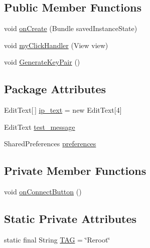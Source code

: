 \subsection*{\-Public \-Member \-Functions}
\begin{DoxyCompactItemize}
\item 
void \hyperlink{classcom_1_1_cyberpad_1_1_reroot_1_1_reroot_activity_a1f36a4a3312550c535dc625f5ef7072a}{on\-Create} (\-Bundle saved\-Instance\-State)
\item 
void \hyperlink{classcom_1_1_cyberpad_1_1_reroot_1_1_reroot_activity_aa996d456dd9e597c9fe8085b4e22f783}{my\-Click\-Handler} (\-View view)
\item 
void \hyperlink{classcom_1_1_cyberpad_1_1_reroot_1_1_reroot_activity_afac3a9035343d21a0ba2d700ec486a49}{\-Generate\-Key\-Pair} ()
\end{DoxyCompactItemize}
\subsection*{\-Package \-Attributes}
\begin{DoxyCompactItemize}
\item 
\-Edit\-Text\mbox{[}$\,$\mbox{]} \hyperlink{classcom_1_1_cyberpad_1_1_reroot_1_1_reroot_activity_ab56d355f53387eea12c89a3cab10dcd9}{ip\-\_\-text} = new \-Edit\-Text\mbox{[}4\mbox{]}
\item 
\-Edit\-Text \hyperlink{classcom_1_1_cyberpad_1_1_reroot_1_1_reroot_activity_a467adf801369ca5593617c80e73efd4f}{test\-\_\-message}
\item 
\-Shared\-Preferences \hyperlink{classcom_1_1_cyberpad_1_1_reroot_1_1_reroot_activity_a6c8f792ba6bd86c21663dce7267655f5}{preferences}
\end{DoxyCompactItemize}
\subsection*{\-Private \-Member \-Functions}
\begin{DoxyCompactItemize}
\item 
void \hyperlink{classcom_1_1_cyberpad_1_1_reroot_1_1_reroot_activity_a893d3e9b146d71671b0eb0f6b90bd0ff}{on\-Connect\-Button} ()
\end{DoxyCompactItemize}
\subsection*{\-Static \-Private \-Attributes}
\begin{DoxyCompactItemize}
\item 
static final \-String \hyperlink{classcom_1_1_cyberpad_1_1_reroot_1_1_reroot_activity_a7588d6075e49fa48846a460f87c29d0c}{\-T\-A\-G} = \char`\"{}\-Reroot\char`\"{}
\end{DoxyCompactItemize}


